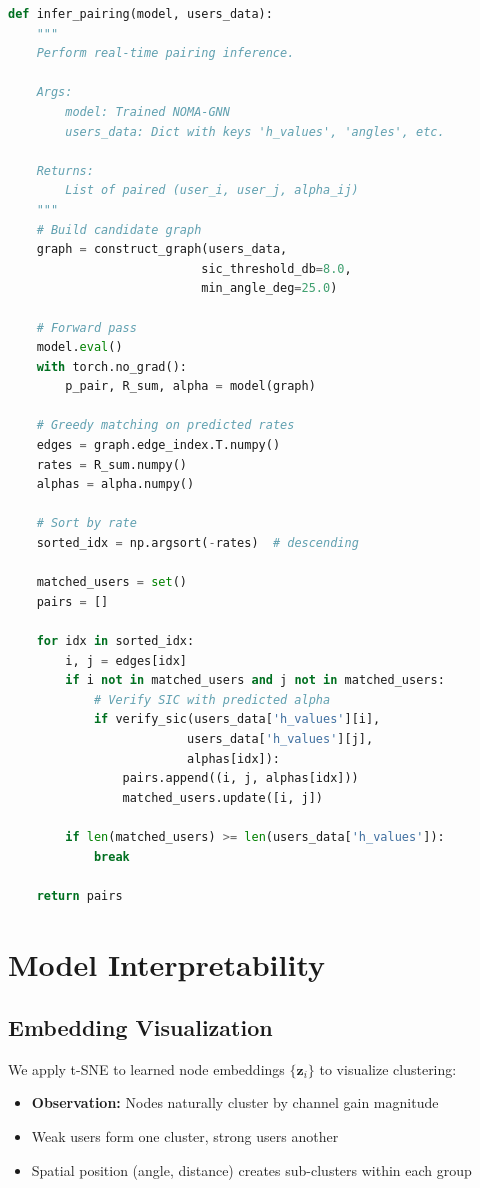 \begin{lstlisting}[language=Python, caption={NOMA-GNN Inference}]
def infer_pairing(model, users_data):
    """
    Perform real-time pairing inference.
    
    Args:
        model: Trained NOMA-GNN
        users_data: Dict with keys 'h_values', 'angles', etc.
    
    Returns:
        List of paired (user_i, user_j, alpha_ij)
    """
    # Build candidate graph
    graph = construct_graph(users_data, 
                           sic_threshold_db=8.0,
                           min_angle_deg=25.0)
    
    # Forward pass
    model.eval()
    with torch.no_grad():
        p_pair, R_sum, alpha = model(graph)
    
    # Greedy matching on predicted rates
    edges = graph.edge_index.T.numpy()
    rates = R_sum.numpy()
    alphas = alpha.numpy()
    
    # Sort by rate
    sorted_idx = np.argsort(-rates)  # descending
    
    matched_users = set()
    pairs = []
    
    for idx in sorted_idx:
        i, j = edges[idx]
        if i not in matched_users and j not in matched_users:
            # Verify SIC with predicted alpha
            if verify_sic(users_data['h_values'][i],
                         users_data['h_values'][j],
                         alphas[idx]):
                pairs.append((i, j, alphas[idx]))
                matched_users.update([i, j])
        
        if len(matched_users) >= len(users_data['h_values']):
            break
    
    return pairs
\end{lstlisting}

\section{Model Interpretability}

\subsection{Embedding Visualization}

We apply t-SNE to learned node embeddings $\{\mathbf{z}_i\}$ to visualize clustering:

\begin{itemize}
    \item \textbf{Observation:} Nodes naturally cluster by channel gain magnitude
    \item Weak users form one cluster, strong users another
    \item Spatial position (angle, distance) creates sub-clusters within each group
\end{itemize}

